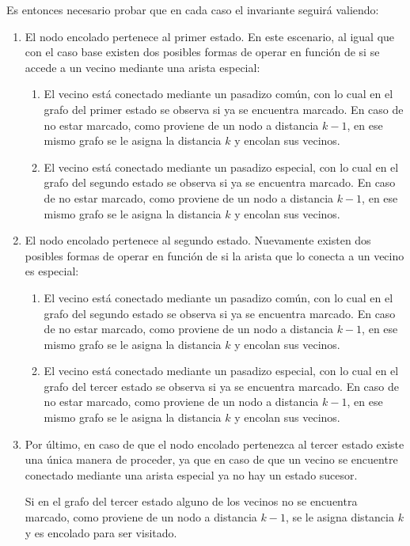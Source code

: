 	Es entonces necesario probar que en cada caso el invariante seguirá
	valiendo:

	\begin{enumerate}
		\item{
			El nodo encolado pertenece al primer estado. En este escenario, al
			igual que con el caso base existen dos posibles formas de operar en
			función de si se accede a un vecino mediante una arista especial:

			\begin{enumerate}
				\item{
					El vecino está conectado mediante un pasadizo común, con lo
					cual en el grafo del primer estado se observa si ya se
					encuentra marcado. En caso de no estar marcado, como
					proviene de un nodo a distancia $k - 1$, en ese mismo grafo
					se le asigna la distancia $k$ y encolan sus vecinos.
				}
				\item{
					El vecino está conectado mediante un pasadizo especial, con
					lo cual en el grafo del segundo estado se observa si ya se
					encuentra marcado. En caso de no estar marcado, como
					proviene de un nodo a distancia $k - 1$, en ese mismo
					grafo se le asigna la distancia $k$ y encolan sus vecinos.
				}
			\end{enumerate}
		}
		\item{
			El nodo encolado pertenece al segundo estado. Nuevamente existen dos
			posibles formas de operar en función de si la arista que lo conecta
			a un vecino es especial:

			\begin{enumerate}
				\item{
					El vecino está conectado mediante un pasadizo común, con lo
					cual en el grafo del segundo estado se observa si ya se
					encuentra marcado. En caso de no estar marcado, como
					proviene de un nodo a distancia $k - 1$, en ese mismo
					grafo se le asigna la distancia $k$ y encolan sus vecinos.
				}
				\item{
					El vecino está conectado mediante un pasadizo especial, con
					lo cual en el grafo del tercer estado se observa si ya se
					encuentra marcado. En caso de no estar marcado, como
					proviene de un nodo a distancia $k - 1$, en ese mismo
					grafo se le asigna la distancia $k$ y encolan sus vecinos.
				}
			\end{enumerate}
		}
		\item{
			Por último, en caso de que el nodo encolado pertenezca al tercer
			estado existe una única manera de proceder, ya que en caso de que un
			vecino se encuentre conectado mediante una arista especial ya no hay
			un estado sucesor.

			Si en el grafo del tercer estado alguno de los vecinos no se
			encuentra marcado, como proviene de un nodo a distancia $k - 1$, se
			le asigna distancia $k$ y es encolado para ser visitado.
		}
	\end{enumerate}

